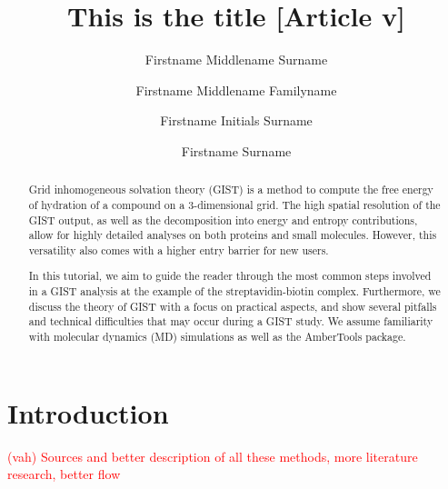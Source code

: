 \documentclass[9pt,tutorial]{livecoms}
\title{This is the title [Article v\versionnumber]}
\author[1*]{Firstname Middlename Surname}
\author[1,2\authfn{1}\authfn{3}]{Firstname Middlename Familyname}
\author[2\authfn{1}\authfn{4}]{Firstname Initials Surname}
\author[2*]{Firstname Surname}
\affil[1]{Institution 1}
\affil[2]{Institution 2}
\newcommand{\todo}{\textcolor{red}}
\begin{document}
\begin{frontmatter}
\maketitle

\begin{abstract}
Grid inhomogeneous solvation theory (GIST) is a method to compute the free energy of hydration of a compound on a 3-dimensional grid.
The high spatial resolution of the GIST output, as well as the decomposition into energy and entropy contributions, allow for highly detailed analyses on both proteins and small molecules. However, this versatility also comes with a higher entry barrier for new users.

In this tutorial, we aim to guide the reader through the most common steps involved in a GIST analysis at the example of the streptavidin-biotin complex.
Furthermore, we discuss the theory of GIST with a focus on practical aspects, and show several pitfalls and technical difficulties that may occur during a GIST study.
We assume familiarity with molecular dynamics (MD) simulations as well as the AmberTools package.

%
\end{abstract}

\end{frontmatter}




\section{Introduction}
\todo{ (vah) Sources and better description of all these methods, more literature research, better flow }
\end{document}
